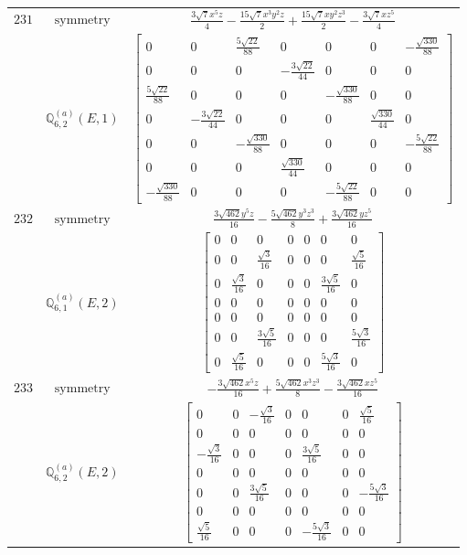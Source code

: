 \documentclass[fleqn,8pt,landscape]{jsarticle}
\begin{document}
\begin{longtable}{ccc}
$ 231 $ & $ \text{symmetry} $ & $ \frac{3 \sqrt{7} x^{5} z}{4} - \frac{15 \sqrt{7} x^{3} y^{2} z}{2} + \frac{15 \sqrt{7} x y^{2} z^{3}}{2} - \frac{3 \sqrt{7} x z^{5}}{4} $ \\
$  $ & $ \mathbb{Q}_{6,2}^{(a)}(E,1) $ & $ \begin{bmatrix} 0 & 0 & \frac{5 \sqrt{22}}{88} & 0 & 0 & 0 & - \frac{\sqrt{330}}{88} \\ 0 & 0 & 0 & - \frac{3 \sqrt{22}}{44} & 0 & 0 & 0 \\ \frac{5 \sqrt{22}}{88} & 0 & 0 & 0 & - \frac{\sqrt{330}}{88} & 0 & 0 \\ 0 & - \frac{3 \sqrt{22}}{44} & 0 & 0 & 0 & \frac{\sqrt{330}}{44} & 0 \\ 0 & 0 & - \frac{\sqrt{330}}{88} & 0 & 0 & 0 & - \frac{5 \sqrt{22}}{88} \\ 0 & 0 & 0 & \frac{\sqrt{330}}{44} & 0 & 0 & 0 \\ - \frac{\sqrt{330}}{88} & 0 & 0 & 0 & - \frac{5 \sqrt{22}}{88} & 0 & 0 \end{bmatrix} $ \\ \hline
$ 232 $ & $ \text{symmetry} $ & $ \frac{3 \sqrt{462} y^{5} z}{16} - \frac{5 \sqrt{462} y^{3} z^{3}}{8} + \frac{3 \sqrt{462} y z^{5}}{16} $ \\
$  $ & $ \mathbb{Q}_{6,1}^{(a)}(E,2) $ & $ \begin{bmatrix} 0 & 0 & 0 & 0 & 0 & 0 & 0 \\ 0 & 0 & \frac{\sqrt{3}}{16} & 0 & 0 & 0 & \frac{\sqrt{5}}{16} \\ 0 & \frac{\sqrt{3}}{16} & 0 & 0 & 0 & \frac{3 \sqrt{5}}{16} & 0 \\ 0 & 0 & 0 & 0 & 0 & 0 & 0 \\ 0 & 0 & 0 & 0 & 0 & 0 & 0 \\ 0 & 0 & \frac{3 \sqrt{5}}{16} & 0 & 0 & 0 & \frac{5 \sqrt{3}}{16} \\ 0 & \frac{\sqrt{5}}{16} & 0 & 0 & 0 & \frac{5 \sqrt{3}}{16} & 0 \end{bmatrix} $ \\ \hline
$ 233 $ & $ \text{symmetry} $ & $ - \frac{3 \sqrt{462} x^{5} z}{16} + \frac{5 \sqrt{462} x^{3} z^{3}}{8} - \frac{3 \sqrt{462} x z^{5}}{16} $ \\
$  $ & $ \mathbb{Q}_{6,2}^{(a)}(E,2) $ & $ \begin{bmatrix} 0 & 0 & - \frac{\sqrt{3}}{16} & 0 & 0 & 0 & \frac{\sqrt{5}}{16} \\ 0 & 0 & 0 & 0 & 0 & 0 & 0 \\ - \frac{\sqrt{3}}{16} & 0 & 0 & 0 & \frac{3 \sqrt{5}}{16} & 0 & 0 \\ 0 & 0 & 0 & 0 & 0 & 0 & 0 \\ 0 & 0 & \frac{3 \sqrt{5}}{16} & 0 & 0 & 0 & - \frac{5 \sqrt{3}}{16} \\ 0 & 0 & 0 & 0 & 0 & 0 & 0 \\ \frac{\sqrt{5}}{16} & 0 & 0 & 0 & - \frac{5 \sqrt{3}}{16} & 0 & 0 \end{bmatrix} $ \\ \hline

\end{longtable}
\end{document}
